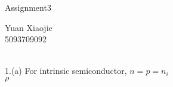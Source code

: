 \documentclass[11pt,oneside,a4paper]{article}
\begin{document}
\begin{center}Assignment3\\\end{center}
\begin{flushright}Yuan Xiaojie\\5093709092\\\end{flushright}

\ \\

1.\:(a) For intrinsic semiconductor, \(n=p=n_i\) \\

\hspace{8.5mm} \(\rho \) \\

\hspace{8.5mm} \(\) \\
\hspace{8.5mm} \(\) \\
\hspace{8.5mm} \(\) \\
\hspace{8.5mm} \(\) \\
\hspace{8.5mm} \(\) \\
\hspace{8.5mm} \(\) \\
\hspace{8.5mm} \(\) \\
\hspace{8.5mm} \(\) \\
\hspace{8.5mm} \(\) \\
\hspace{8.5mm} \(\) \\
\hspace{8.5mm} \(\) \\
\hspace{8.5mm} \(\) \\
\end{document}
